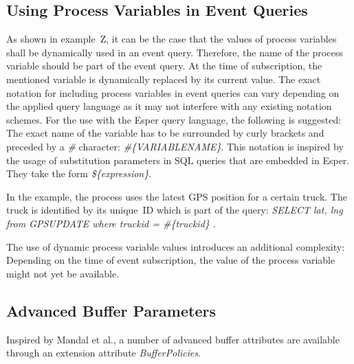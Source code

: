 \subsection{Using Process Variables in Event Queries}



As shown in example~Z, it can be the case that the values of process variables shall be dynamically used in an event query.
Therefore, the name of the process variable should be part of the event query. At the time of subscription, the mentioned variable is dynamically replaced by its current value.
The exact notation for including process variables in event queries can vary depending on the applied query language as it may not interfere with any existing notation schemes.
For the use with the Esper query language, the following is suggested: The exact name of the variable has to be surrounded by curly brackets and preceded by a \textit{\#} character: \textit{\#\{VARIABLENAME\}}.
This notation is inspired by the usage of substitution parameters in SQL queries that are embedded in Esper. They take the form \textit{\$\{expression\}}.

In the example, the process uses the latest GPS position for a certain truck. The truck is identified by its unique~ID which is part of the query: \textit{SELECT lat, lng from GPSUPDATE where truckid = \#\{truckid\} }.

The use of dynamic process variable values introduces an additional complexity: Depending on the time of event subscription, the value of the process variable might not yet be available.


\subsection{Advanced Buffer Parameters}
Inspired by Mandal et al., a number of advanced buffer attributes are available through an extension attribute \textit{BufferPolicies}.

